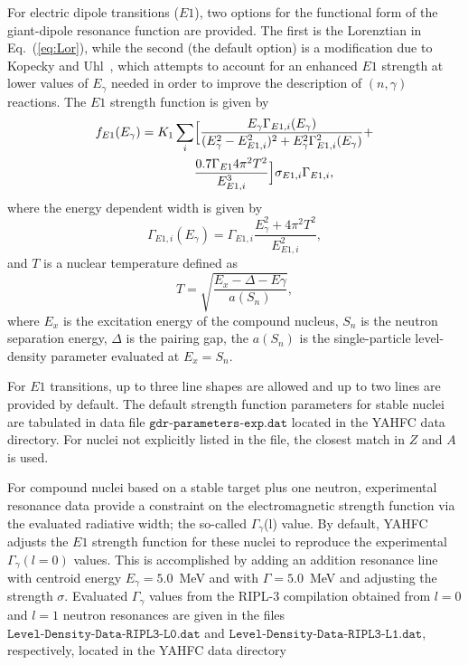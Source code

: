 \documentclass[
10pt,
showpacs,preprintnumbers,footinbib,
amsfonts,amsmath,amssymb,
aps,
prc,twocolumn,groupedaddress,superscriptaddress,
showkeys,
nofootinbib
]{revtex4-1}
\begin{document}
For electric dipole transitions ($E1$), two options for the functional form of the giant-dipole resonance function are provided. The first is the Lorenztian in Eq.~(\ref{eq:Lor}), while the second (the default option) is a modification due to Kopecky and Uhl~\cite{Kopecky:1990}, which attempts to account for an enhanced $E1$ strength at lower values of $E_\gamma$ needed in order to improve  the description of $(n,\gamma)$ reactions. The $E1$ strength function is given by
\begin{align}
f_{E1}(E_\gamma ) = K_1 \sum_i & \Bigl[ \frac{E_\gamma\Gamma_{E1,i}(E_\gamma)}{(E_\gamma^2 - E^2_{E1,i})^2+E^2_\gamma\Gamma^2_{E1,i}(E_\gamma)} +\notag\\
& \frac{0.7\Gamma_{E1}4\pi^2 T^2}{E_{E1,i}^3}\Bigr ]\sigma_{E1,i}\Gamma_{E1,i},
\end{align}
where the energy dependent width is given by
\begin{equation}
\Gamma_{E1,i}(E_\gamma) = \Gamma_{E1,i}\frac{ E_\gamma^2+4\pi^2T^2} {E^2_{E1,i}},
\end{equation} 
and $T$ is a nuclear temperature defined as
\begin{equation}
T = \sqrt{\frac{ E_x -\Delta - E\gamma} {a(S_n)}},
\end{equation}
where $E_x$ is the excitation energy of the compound nucleus, $S_n$ is the neutron separation energy, $\Delta$ is the pairing gap, the $a(S_n)$ is the single-particle level-density parameter evaluated at $E_x=S_n$.

For $E1$ transitions, up to three line shapes are allowed and up to two lines are provided by default. The default strength function parameters for stable nuclei are tabulated in data file ${\texttt{gdr-parameters-exp.dat}}$ located in the YAHFC data directory. For nuclei not explicitly listed in the file, the closest match in $Z$ and $A$ is used.

For compound nuclei based on a stable target plus one neutron, experimental resonance data provide a constraint on the electromagnetic strength function via the evaluated radiative width; the so-called $\Gamma_\gamma$(l) value. By default, YAHFC adjusts the $E1$ strength function for these nuclei to reproduce the experimental $\Gamma_\gamma(l=0)$ values. This is accomplished by adding an addition resonance line with centroid energy $E_\gamma = 5.0$~MeV and with $\Gamma = 5.0$~MeV and adjusting the strength $\sigma$. Evaluated $\Gamma_\gamma$ values from the RIPL-3 compilation obtained from $l=0$ and $l=1$ neutron resonances are given in the files ${\texttt{Level-Density-Data-RIPL3-L0.dat}}$ and ${\texttt{Level-Density-Data-RIPL3-L1.dat}}$, respectively, located in the YAHFC data directory
\end{document}
